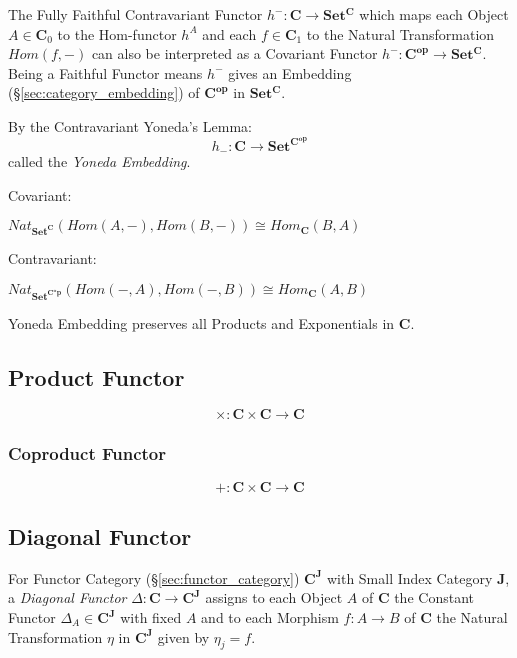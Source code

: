 The Fully Faithful Contravariant Functor $h^- : \mathbf{C} \rightarrow
\mathbf{Set^C}$ which maps each Object $A \in \mathbf{C}_0$ to the
Hom-functor $h^A$ and each $f \in \mathbf{C}_1$ to the Natural
Transformation $Hom(f,-)$ can also be interpreted as a Covariant
Functor $h^- : \mathbf{C^{op}} \rightarrow \mathbf{Set^C}$. Being a
Faithful Functor means $h^-$ gives an Embedding
(\S\ref{sec:category_embedding}) of $\mathbf{C^{op}}$ in
$\mathbf{Set^C}$.

By the Contravariant Yoneda's Lemma:
\[
  h_-: \mathbf{C} \rightarrow \mathbf{Set^{C^{op}}}
\]
called the \emph{Yoneda Embedding}.

Covariant:

$Nat_\mathbf{Set^C}(Hom(A,-), Hom(B,-)) \cong Hom_\mathbf{C}(B,A)$

Contravariant:

$Nat_\mathbf{Set^{C^op}}(Hom(-,A), Hom(-,B)) \cong Hom_\mathbf{C}(A,B)$

Yoneda Embedding preserves all Products and Exponentials in
$\mathbf{C}$.


\subsection{Product Functor}\label{sec:product_functor}

\[
  \times : \mathbf{C} \times \mathbf{C} \rightarrow \mathbf{C}
\]



\subsubsection{Coproduct Functor}\label{sec:coproduct_functor}

\[
  + : \mathbf{C} \times \mathbf{C} \rightarrow \mathbf{C}
\]



\subsection{Diagonal Functor}\label{sec:diagonal_functor}

For Functor Category (\S\ref{sec:functor_category})
$\mathbf{C}^\mathbf{J}$ with Small Index Category $\mathbf{J}$, a
\emph{Diagonal Functor} $\Delta : \mathbf{C} \rightarrow
\mathbf{C}^\mathbf{J}$ assigns to each Object $A$ of $\mathbf{C}$ the
Constant Functor $\Delta_A \in \mathbf{C}^\mathbf{J}$ with fixed $A$
and to each Morphism $f : A \rightarrow B$ of $\mathbf{C}$ the Natural
Transformation $\eta$ in $\mathbf{C}^\mathbf{J}$ given by $\eta_j =
f$.

